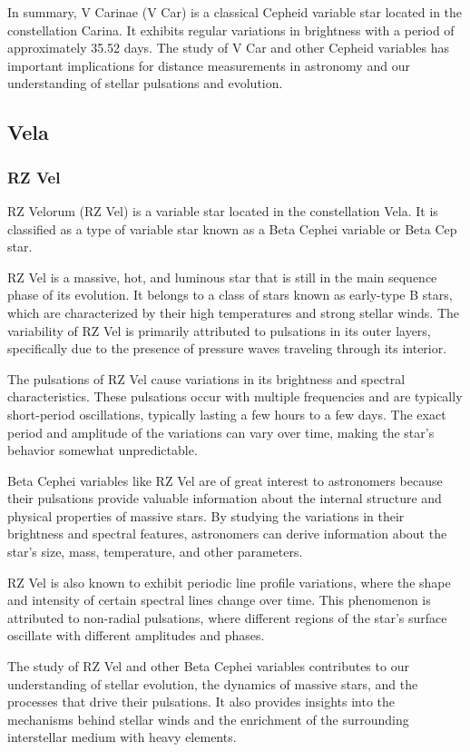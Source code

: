 In summary, V Carinae (V Car) is a classical Cepheid variable star located in the constellation Carina. It exhibits regular variations in brightness with a period of approximately 35.52 days. The study of V Car and other Cepheid variables has important implications for distance measurements in astronomy and our understanding of stellar pulsations and evolution.

\subsection{Vela}
\subsubsection*{ RZ Vel }
RZ Velorum (RZ Vel) is a variable star located in the constellation Vela. It is classified as a type of variable star known as a Beta Cephei variable or Beta Cep star.

RZ Vel is a massive, hot, and luminous star that is still in the main sequence phase of its evolution. It belongs to a class of stars known as early-type B stars, which are characterized by their high temperatures and strong stellar winds. The variability of RZ Vel is primarily attributed to pulsations in its outer layers, specifically due to the presence of pressure waves traveling through its interior.

The pulsations of RZ Vel cause variations in its brightness and spectral characteristics. These pulsations occur with multiple frequencies and are typically short-period oscillations, typically lasting a few hours to a few days. The exact period and amplitude of the variations can vary over time, making the star's behavior somewhat unpredictable.

Beta Cephei variables like RZ Vel are of great interest to astronomers because their pulsations provide valuable information about the internal structure and physical properties of massive stars. By studying the variations in their brightness and spectral features, astronomers can derive information about the star's size, mass, temperature, and other parameters.

RZ Vel is also known to exhibit periodic line profile variations, where the shape and intensity of certain spectral lines change over time. This phenomenon is attributed to non-radial pulsations, where different regions of the star's surface oscillate with different amplitudes and phases.

The study of RZ Vel and other Beta Cephei variables contributes to our understanding of stellar evolution, the dynamics of massive stars, and the processes that drive their pulsations. It also provides insights into the mechanisms behind stellar winds and the enrichment of the surrounding interstellar medium with heavy elements.

